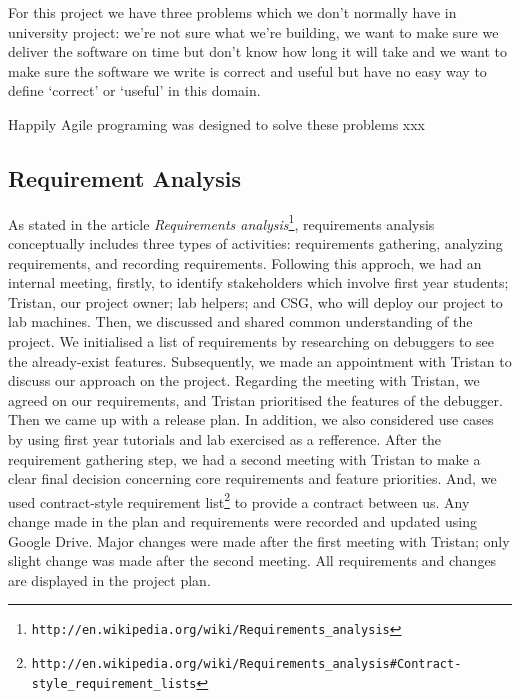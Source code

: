 \documentclass[11pt]{article}
\begin{document}
For this project we have three problems which we don't normally have in university project: we're not sure what we're building, we want to make sure we deliver the software on time but don't know how long it will take and
we want to make sure the software we write is correct and useful but have no easy way to define `correct' or `useful' in this domain.

Happily Agile programing was designed to solve these problems xxx

\subsection{Requirement Analysis}
As stated in the article \textit{Requirements analysis}\footnote{\tt{http://en.wikipedia.org/wiki/Requirements\_analysis}}, requirements analysis conceptually includes three types of activities: requirements gathering, analyzing requirements, and recording requirements.
Following this approch, we had an internal meeting, firstly, to identify stakeholders which involve first year students; Tristan, our project owner; lab helpers; and CSG, who will deploy our project to lab machines. Then, we discussed and shared common understanding of the project. We initialised a list of requirements by researching on debuggers to see the already-exist features. Subsequently, we made an appointment with Tristan to discuss our approach on the project. Regarding the meeting with Tristan, we agreed on our requirements, and Tristan prioritised the features of the debugger. Then we came up with a release plan. In addition, we also considered use cases by using first year tutorials and lab exercised as a refference. After the requirement gathering step, we had a second meeting with Tristan to make a clear final decision concerning core requirements and feature priorities. And, we used contract-style requirement list\footnote{\tt{http://en.wikipedia.org/wiki/Requirements\_analysis\#Contract-style\_requirement\_lists}} to provide a contract between us.
Any change made in the plan and requirements were recorded and updated using Google Drive. Major changes were made after the first meeting with Tristan; only slight change was made after the second meeting.
All requirements and changes are displayed in the project plan.
\end{document}
